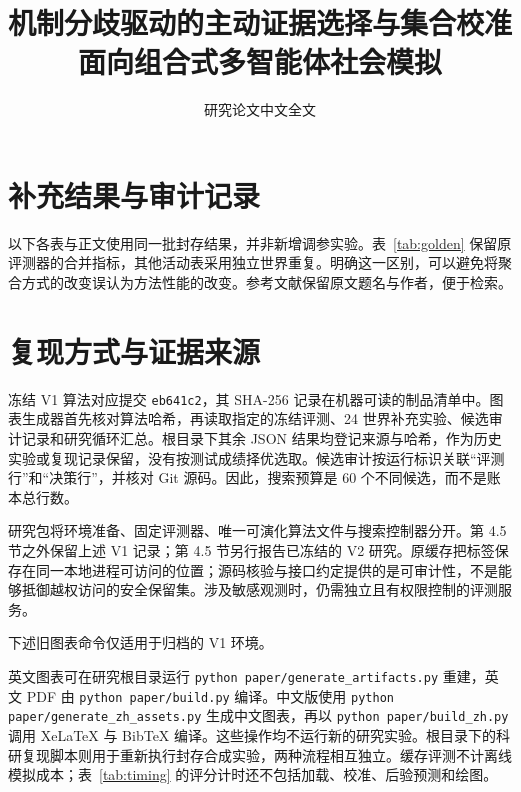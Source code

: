 \documentclass[UTF8,10pt,fontset=none]{ctexart}
\title{机制分歧驱动的主动证据选择与集合校准\\面向组合式多智能体社会模拟}
\author{研究论文中文全文}
\date{}
\begin{document}
\maketitle








\clearpage
\appendix
\section{补充结果与审计记录}
\label{app:results}
以下各表与正文使用同一批封存结果，并非新增调参实验。表~\ref{tab:golden} 保留原评测器的合并指标，其他活动表采用独立世界重复。明确这一区别，可以避免将聚合方式的改变误认为方法性能的改变。参考文献保留原文题名与作者，便于检索。





\FloatBarrier
\section{复现方式与证据来源}
\label{app:reproduction}
冻结 V1 算法对应提交 \texttt{eb641c2}，其 SHA-256 记录在机器可读的制品清单中。图表生成器首先核对算法哈希，再读取指定的冻结评测、24 世界补充实验、候选审计记录和研究循环汇总。根目录下其余 JSON 结果均登记来源与哈希，作为历史实验或复现记录保留，没有按测试成绩择优选取。候选审计按运行标识关联“评测行”和“决策行”，并核对 Git 源码。因此，搜索预算是 60 个不同候选，而不是账本总行数。

研究包将环境准备、固定评测器、唯一可演化算法文件与搜索控制器分开。第 4.5 节之外保留上述 V1 记录；第 4.5 节另行报告已冻结的 V2 研究。原缓存把标签保存在同一本地进程可访问的位置；源码核验与接口约定提供的是可审计性，不是能够抵御越权访问的安全保留集。涉及敏感观测时，仍需独立且有权限控制的评测服务。

下述旧图表命令仅适用于归档的 V1 环境。

英文图表可在研究根目录运行 \texttt{python paper/generate\_artifacts.py} 重建，英文 PDF 由 \texttt{python paper/build.py} 编译。中文版使用 \texttt{python paper/generate\_zh\_assets.py} 生成中文图表，再以 \texttt{python paper/build\_zh.py} 调用 XeLaTeX 与 BibTeX 编译。这些操作均不运行新的研究实验。根目录下的科研复现脚本则用于重新执行封存合成实验，两种流程相互独立。缓存评测不计离线模拟成本；表~\ref{tab:timing} 的评分计时还不包括加载、校准、后验预测和绘图。
\end{document}
